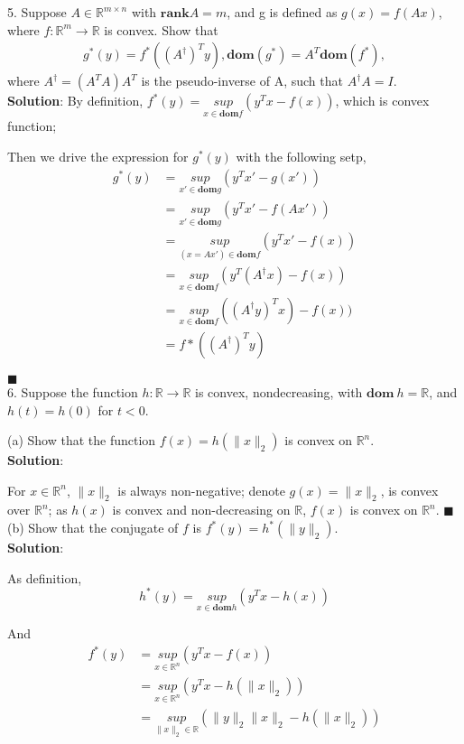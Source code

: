 \documentclass{article}
\begin{document}
5. Suppose $A \in \mathbb{R}^{m \times n}$ with $\textbf{rank} A=m$, and g is defined as $g(x)=f(Ax)$, where $f:\mathbb{R}^m \to \mathbb{R}$ is convex. Show that
\begin{align}
	g^*(y)=f^*( (A^\dagger)^Ty ), \textbf{dom}(g^*) = A^T\textbf{dom}(f^*), \nonumber
\end{align}
where $A^\dagger=(A^T A)A^T$ is the pseudo-inverse of A, such that $A^\dagger A = I$. \\

\textbf{Solution}:
By definition, $ f^*(y) = \underset{x \in \textbf{dom}f}{sup} (y^Tx - f(x))$, which is convex function;

Then we drive the expression for $g^*(y)$ with the following setp,
\begin{align*}
	g^*(y) &= \underset{x' \in \textbf{dom}g}{sup} (y^Tx' - g(x')) \\
	&= \underset{x' \in \textbf{dom}g}{sup} (y^Tx' - f(Ax')) \\
	&= \underset{(x=Ax') \in \textbf{dom}f}{sup} (y^Tx' - f(x)) \\
	&= \underset{x \in \textbf{dom}f}{sup} (y^T(A^{\dagger}x) - f(x)) \\
	&= \underset{x \in \textbf{dom}f}{sup} ((A^{\dagger}y)^T x) - f(x)) \\
	&= f*((A^\dagger)^T y)
\end{align*}

$\blacksquare$ \\

6. Suppose the function $h:\mathbb{R}\to\mathbb{R}$ is convex, nondecreasing, with $\textbf{dom}\ h=\mathbb{R}$, and $h(t)=h(0)$ for $t<0$.

(a) Show that the function $f(x)=h(\|x\|_2)$ is convex on $\mathbb{R}^n$. \\

\textbf{Solution}:

For $x \in \mathbb{R}^n$, $ \|x\|_2 $ is always non-negative; denote $ g(x) = \|x\|_2 $, is convex over $\mathbb{R}^n$; as $h(x)$ is convex and non-decreasing on $\mathbb{R}$, $f(x)$ is convex on $\mathbb{R}^n$. $\blacksquare$ \\

(b) Show that the conjugate of $f$ is $f^*(y)=h^*(\|y\|_2)$. \\

\textbf{Solution}:

As definition,
\[
	h^*(y) = \underset{x \in \textbf{dom}h}{sup} (y^Tx - h(x))
\]

And
\begin{align*}
	f^*(y) &= \underset{x \in \mathbb{R}^n}{sup} (y^Tx - f(x)) \\
	&= \underset{x \in \mathbb{R}^n}{sup} (y^Tx - h(\|x\|_2)) \\
	&= \underset{\|x\|_2 \in \mathbb{R}}{sup} (\|y\|_2 \|x\|_2 - h(\|x\|_2))
\end{align*}
\end{document}
